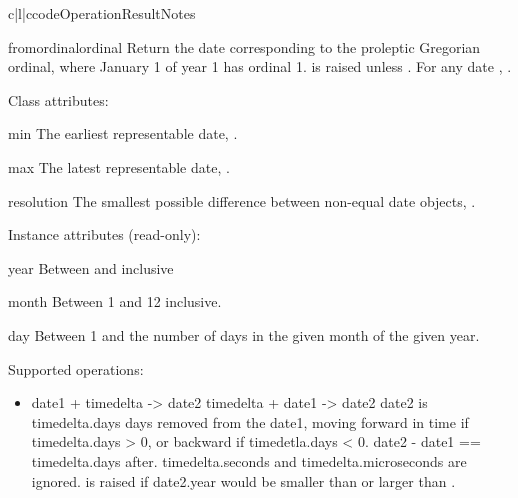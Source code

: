 \begin{tableiii}{c|l|c}{code}{Operation}{Result}{Notes}
\begin{methoddesc}{fromordinal}{ordinal}
    Return the date corresponding to the proleptic Gregorian ordinal,
    where January 1 of year 1 has ordinal 1.  
    is raised unless .  For any
    date , .
\end{methoddesc}

Class attributes:

\begin{memberdesc}{min}
        The earliest representable date, .
\end{memberdesc}

\begin{memberdesc}{max}
        The latest representable date, .
\end{memberdesc}

\begin{memberdesc}{resolution}
        The smallest possible difference between non-equal date
        objects, .
\end{memberdesc}

Instance attributes (read-only):

\begin{memberdesc}{year}
Between  and  inclusive
\end{memberdesc}

\begin{memberdesc}{month}
Between 1 and 12 inclusive.
\end{memberdesc}

\begin{memberdesc}{day}
Between 1 and the number of days in the given month
                    of the given year.
\end{memberdesc}

Supported operations:

\begin{itemize}
  \item
    date1 + timedelta -> date2
    timedelta + date1 -> date2
    date2 is timedelta.days days removed from the date1, moving forward
    in time if timedelta.days > 0, or backward if timedetla.days < 0.
    date2 - date1 == timedelta.days after.  timedelta.seconds and
    timedelta.microseconds are ignored.   is
    raised if date2.year would be smaller than  or
    larger than .


\end{itemize}
\end{tableiii}
